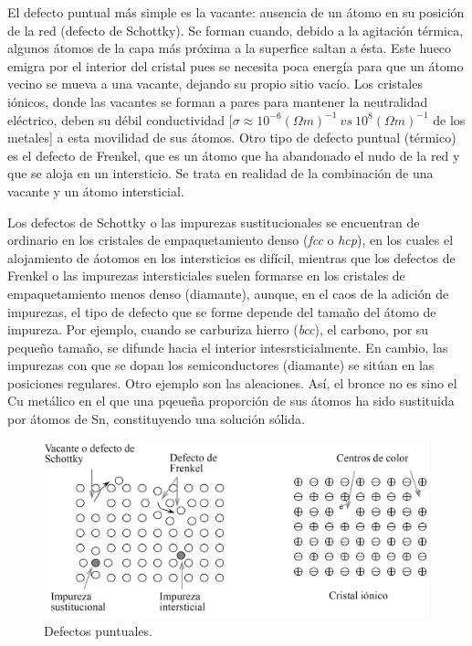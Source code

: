 El defecto puntual más simple es la vacante: ausencia de un átomo en su posición de la red (defecto de Schottky). Se forman cuando, debido a la agitación térmica, algunos átomos de la capa más próxima a la superfice saltan a ésta. Este hueco emigra por el interior del cristal pues se necesita poca energía para que un átomo vecino se mueva a una vacante, dejando su propio sitio vacío. Los cristales iónicos, donde las vacantes se forman a pares para mantener la neutralidad eléctrico, deben su débil conductividad $[ \sigma \approx 10^{-6} (\Omega m)^{-1} \ vs \ 10^8 (\Omega m)^{-1}$ de los metales] a esta movilidad de sus  átomos. Otro tipo de defecto puntual (térmico) es el defecto de Frenkel, que es un átomo que ha abandonado el nudo de la red y que se aloja en un intersticio. Se trata en realidad de la combinación de una vacante y un átomo intersticial. %

Los defectos de Schottky o las impurezas sustitucionales se encuentran de ordinario en los cristales de empaquetamiento denso ({\it fcc} o {\it hcp}), en los cuales el alojamiento de áotomos en los intersticios es difícil, mientras que los defectos de Frenkel o las impurezas intersticiales suelen formarse en los cristales de empaquetamiento menos denso (diamante), aunque, en el caos de la adición de impurezas, el tipo de defecto que se forme depende del tamaño del átomo de impureza. Por ejemplo, cuando se carburiza hierro ({\it bcc}), el carbono, por su pequeño tamaño, se difunde hacia el interior intesrsticialmente. En cambio, las impurezas con que se dopan los semiconductores (diamante) se sitúan en las posiciones regulares. Otro ejemplo son las aleaciones. Así, el bronce no es sino el Cu metálico en el que una pqeueña proporción de sus átomos ha sido sustituida por átomos de Sn, constituyendo una solución sólida. 

\begin{figure}[h!] \centering
    \includegraphics[scale=0.42]{Cuerpo/Ch_01/defectos.png}
    \caption{Defectos puntuales.}
\end{figure}


